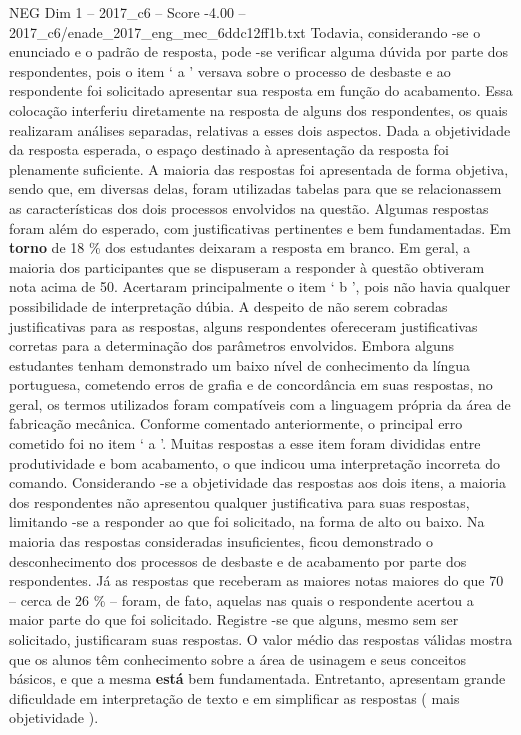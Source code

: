 \begin{textsample}{NEG Dim 1 – 2017\_c6 – Score -4.00 – 2017\_c6/enade\_2017\_eng\_mec\_6ddc12ff1b.txt}
Todavia, considerando -se o enunciado e o padrão de resposta, pode -se verificar alguma dúvida por parte dos respondentes, pois o item ‘ a ’ versava sobre o processo de desbaste e ao respondente foi solicitado apresentar sua resposta em função do acabamento.
Essa colocação interferiu diretamente na resposta de alguns dos respondentes, os quais realizaram análises separadas, relativas a esses dois aspectos.
Dada a objetividade da resposta esperada, o espaço destinado à apresentação da resposta foi plenamente suficiente.
A maioria das respostas foi apresentada de forma objetiva, sendo que, em diversas delas, foram utilizadas tabelas para que se relacionassem as características dos dois processos envolvidos na questão.
Algumas respostas foram além do esperado, com justificativas pertinentes e bem fundamentadas.
Em \textbf{torno} de 18 \% dos estudantes deixaram a resposta em branco.
Em geral, a maioria dos participantes que se dispuseram a responder à questão obtiveram nota acima de 50.
Acertaram principalmente o item ‘ b ’, pois não havia qualquer possibilidade de interpretação dúbia.
A despeito de não serem cobradas justificativas para as respostas, alguns respondentes ofereceram justificativas corretas para a determinação dos parâmetros envolvidos.
Embora alguns estudantes tenham demonstrado um baixo nível de conhecimento da língua portuguesa, cometendo erros de grafia e de concordância em suas respostas, no geral, os termos utilizados foram compatíveis com a linguagem própria da área de fabricação mecânica.
Conforme comentado anteriormente, o principal erro cometido foi no item ‘ a ’.
Muitas respostas a esse item foram divididas entre produtividade e bom acabamento, o que indicou uma interpretação incorreta do comando.
Considerando -se a objetividade das respostas aos dois itens, a maioria dos respondentes não apresentou qualquer justificativa para suas respostas, limitando -se a responder ao que foi solicitado, na forma de alto ou baixo.
Na maioria das respostas consideradas insuficientes, ficou demonstrado o desconhecimento dos processos de desbaste e de acabamento por parte dos respondentes.
Já as respostas que receberam as maiores notas maiores do que 70 – cerca de 26 \% – foram, de fato, aquelas nas quais o respondente acertou a maior parte do que foi solicitado.
Registre -se que alguns, mesmo sem ser solicitado, justificaram suas respostas.
O valor médio das respostas válidas mostra que os alunos têm conhecimento sobre a área de usinagem e seus conceitos básicos, e que a mesma \textbf{está} bem fundamentada.
Entretanto, apresentam grande dificuldade em interpretação de texto e em simplificar as respostas ( mais objetividade ).

\end{textsample}
